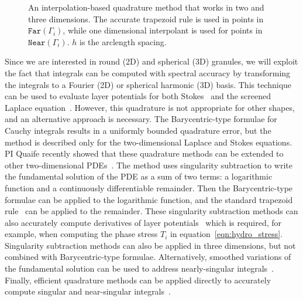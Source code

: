 \begin{figure}
  \vspace{-4pt}
  \centering
  
  \vspace{-15pt}
  \caption{\label{fig:interpquad} \footnotesize An interpolation-based
  quadrature method that works in two and three dimensions. The accurate
  trapezoid rule is used in points in $\mathtt{Far}(\Gamma_i)$, while
  one dimensional interpolant is used for points in
  $\mathtt{Near}(\Gamma_i)$. $h$ is the arclength spacing.}
\end{figure}
Since we are interested in round (2D) and spherical (3D) granules, we
will exploit the fact that integrals can be computed with spectral
accuracy by transforming the integrals to a Fourier (2D) or spherical
harmonic (3D) basis. This technique can be used to evaluate layer
potentials for both Stokes~\cite{cor-vee2018} and the screened Laplace
equation~\cite{koh-cor-che-vee2021}. However, this quadrature is not
appropriate for other shapes, and an alternative approach is necessary.
The Barycentric-type formulae for Cauchy integrals results in a
uniformly bounded quadrature error, but the method is described only for
the two-dimensional Laplace and Stokes equations. PI Quaife recently
showed that these quadrature methods can be extended to other
two-dimensional PDEs~\cite{che-lin-her-qua2022}. The method uses
singularity subtraction to write the fundamental solution of the PDE as
a sum of two terms: a logarithmic function and a continuously
differentiable remainder. Then the Barycentric-type formulae can be
applied to the logarithmic function, and the standard trapezoid
rule~\cite{tre-wei2014} can be applied to the remainder. These
singularity subtraction methods can also accurately compute derivatives
of layer potentials~\cite{car2021, car2020, car-kha-kim2018} which is
required, for example, when computing the phase
stress $T_i$ in equation~\eqref{eqn:hydro_stress}. Singularity subtraction methods can
also be applied in three dimensions, but not combined with
Barycentric-type formulae. Alternatively, smoothed variations of the
fundamental solution can be used to address nearly-singular
integrals~\cite{beale1, cor2001, tlu-bea2019}. Finally, efficient
quadrature methods can be applied directly to accurately compute
singular and near-singular integrals~\cite{khayat_2005,
gimbutas2013sisc}.


